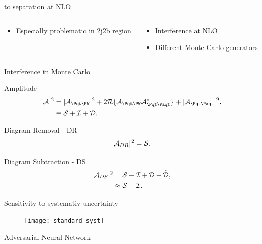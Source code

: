 \begin{frame}{\tW to \ttbar separation at NLO}
\begin{columns}
\begin{column}{0.45\textwidth}
\begin{itemize}
\item Especially problematic in 2j2b region
\end{itemize}
    \end{column}
    \quad
    \begin{column}{0.45\textwidth}
\begin{itemize}
\item Interference at NLO
\item Different Monte Carlo generators
\end{itemize}
    \end{column}
\quad
\end{columns}
\end{frame}

\begin{frame}{Interference in Monte Carlo}
\begin{block}{Amplitude}
\vspace{-0.3cm}
\begin{align*}
|\Aamp|^2 &= |\Atw|^2 + 2 \mathcal{R} \{ \Atw \Att^{\ast} \} + |\Att|^2, \\
&\equiv \Samp + \Iamp + \Damp.
\end{align*}
\end{block}
\begin{block}{Diagram Removal - DR}
\vspace{-0.3cm}
\begin{align*}
| \mathcal{A}_{DR} |^2 = \mathcal{S}.
\end{align*}
\end{block}
\begin{block}{Diagram Subtraction - DS}
\vspace{-0.3cm}
\begin{align*}
| \mathcal{A}_{DS} |^2 &= \mathcal{S} + \mathcal{I} + \mathcal{D} - \widetilde{\mathcal{D}},\\
&\approx \mathcal{S} + \mathcal{I}.
\end{align*}
\end{block}
\end{frame}

\begin{frame}{Sensitivity to systemativ uncertainty}
\vspace{-0.2cm}
\begin{figure}
        \texttt{[image: standard\_syst]}
\end{figure}
\end{frame}

\begin{frame}[c]
\begin{center}
\Huge Adversarial Neural Network
\end{center}
\end{frame}

